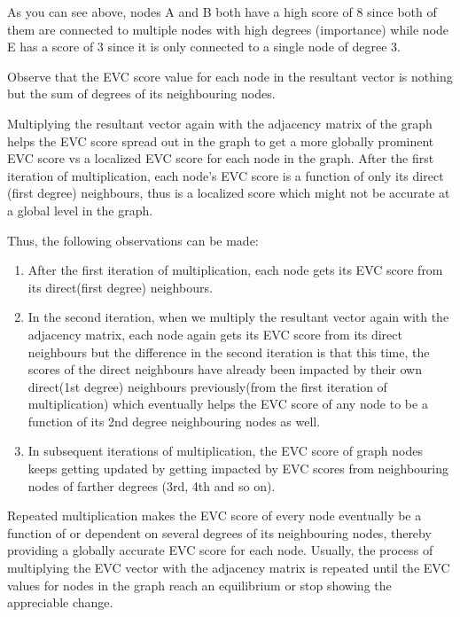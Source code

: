 \documentclass[12pt, a4paper]{article}
\begin{document}
\begin{flushleft}
    As you can see above, nodes A and B both have a high score of 8 since both of them are connected to multiple nodes with high degrees (importance) while node E has a score of 3 since it is only connected to a single node of degree 3.
    
    Observe that the EVC score value for each node in the resultant vector is nothing but the sum of degrees of its neighbouring nodes.
    
    Multiplying the resultant vector again with the adjacency matrix of the graph helps the EVC score spread out in the graph to get a more globally prominent EVC score vs a localized EVC score for each node in the graph. After the first iteration of multiplication, each node’s EVC score is a function of only its direct (first degree) neighbours, thus is a localized score which might not be accurate at a global level in the graph.

    Thus, the following observations can be made:

    \begin{enumerate}
    \item After the first iteration of multiplication, each node gets its EVC score from its direct(first degree) neighbours.
    
    \item In the second iteration, when we multiply the resultant vector again with the adjacency matrix, each node again gets its EVC score from its direct neighbours but the difference in the second iteration is that this time, the scores of the direct neighbours have already been impacted by their own direct(1st degree) neighbours previously(from the first iteration of multiplication) which eventually helps the EVC score of any node to be a function of its 2nd degree neighbouring nodes as well.
    
    \item In subsequent iterations of multiplication, the EVC score of graph nodes keeps getting updated by getting impacted by EVC scores from neighbouring nodes of farther degrees (3rd, 4th and so on).
    
    \end{enumerate}
    Repeated multiplication makes the EVC score of every node eventually be a function of or dependent on several degrees of its neighbouring nodes, thereby providing a globally accurate EVC score for each node. Usually, the process of multiplying the EVC vector with the adjacency matrix is repeated until the EVC values for nodes in the graph reach an equilibrium or stop showing the appreciable change.


\end{flushleft}
\end{document}
